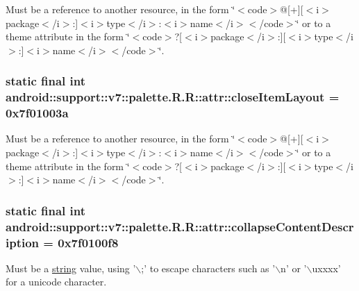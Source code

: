 Must be a reference to another resource, in the form \char`\"{}$<$code$>$@\mbox{[}+\mbox{]}\mbox{[}$<$i$>$package$<$/i$>$:\mbox{]}$<$i$>$type$<$/i$>$:$<$i$>$name$<$/i$>$$<$/code$>$\char`\"{} or to a theme attribute in the form \char`\"{}$<$code$>$?\mbox{[}$<$i$>$package$<$/i$>$:\mbox{]}\mbox{[}$<$i$>$type$<$/i$>$:\mbox{]}$<$i$>$name$<$/i$>$$<$/code$>$\char`\"{}. \hypertarget{classandroid_1_1support_1_1v7_1_1palette_1_1_r_1_1attr_58eda3e05eda1b6ab9a4d92fe81a4fba}{
\subsubsection[{closeItemLayout}]{\setlength{\rightskip}{0pt plus 5cm}static final int android::support::v7::palette.R.R::attr::closeItemLayout = 0x7f01003a}}
\label{classandroid_1_1support_1_1v7_1_1palette_1_1_r_1_1attr_58eda3e05eda1b6ab9a4d92fe81a4fba}


Must be a reference to another resource, in the form \char`\"{}$<$code$>$@\mbox{[}+\mbox{]}\mbox{[}$<$i$>$package$<$/i$>$:\mbox{]}$<$i$>$type$<$/i$>$:$<$i$>$name$<$/i$>$$<$/code$>$\char`\"{} or to a theme attribute in the form \char`\"{}$<$code$>$?\mbox{[}$<$i$>$package$<$/i$>$:\mbox{]}\mbox{[}$<$i$>$type$<$/i$>$:\mbox{]}$<$i$>$name$<$/i$>$$<$/code$>$\char`\"{}. \hypertarget{classandroid_1_1support_1_1v7_1_1palette_1_1_r_1_1attr_d8afbd45a21248b36d1ed40e17f2fe56}{
\subsubsection[{collapseContentDescription}]{\setlength{\rightskip}{0pt plus 5cm}static final int android::support::v7::palette.R.R::attr::collapseContentDescription = 0x7f0100f8}}
\label{classandroid_1_1support_1_1v7_1_1palette_1_1_r_1_1attr_d8afbd45a21248b36d1ed40e17f2fe56}


Must be a \hyperlink{classandroid_1_1support_1_1v7_1_1palette_1_1_r_1_1string}{string} value, using '$\backslash$;' to escape characters such as '$\backslash$n' or '$\backslash$uxxxx' for a unicode character. 

